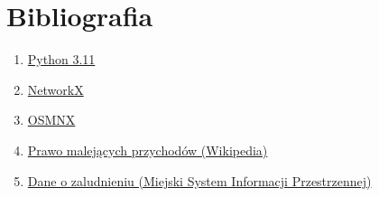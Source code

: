 \documentclass[12pt,a4paper]{article}
\begin{document}
\section{Bibliografia}
\begin{enumerate}

\item\href{
https://docs.python.org/3/
}{Python 3.11}

\item\href{
https://networkx.org/documentation/stable/index.html
}{NetworkX}

\item\href{https://osmnx.readthedocs.io/en/stable/}{OSMNX}

\item\href{https://pl.wikipedia.org/wiki/Prawo_malej%C4%85cych_przychod%C3%B3w}{Prawo malejących przychodów (Wikipedia)}

\item\href{https://msip.krakow.pl}{Dane o zaludnieniu (Miejski System Informacji Przestrzennej)}
\end{enumerate}
\end{document}
